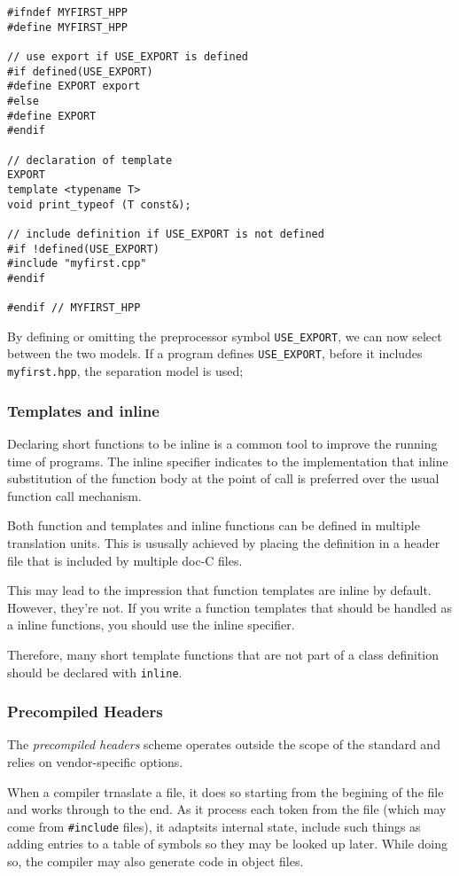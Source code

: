 \documentclass[11pt, a4paper]{book}
\begin{document}
\begin{itemize}
\begin{verbatim}
#ifndef MYFIRST_HPP 
#define MYFIRST_HPP 

// use export if USE_EXPORT is defined 
#if defined(USE_EXPORT) 
#define EXPORT export 
#else 
#define EXPORT 
#endif 

// declaration of template 
EXPORT 
template <typename T> 
void print_typeof (T const&); 

// include definition if USE_EXPORT is not defined 
#if !defined(USE_EXPORT) 
#include "myfirst.cpp" 
#endif 

#endif // MYFIRST_HPP 
\end{verbatim}
By defining or omitting the preprocessor symbol \verb|USE_EXPORT|, we can now select between the two models. If a program defines \verb|USE_EXPORT|, before it includes \verb|myfirst.hpp|, the separation model is used;
\subsubsection{Templates and inline}
Declaring short functions to be inline is a common tool to improve the running time of programs. The inline specifier indicates to the implementation that inline substitution of the function body at the point of call is preferred over the usual function call mechanism. 

Both function and templates and inline functions can be defined in multiple translation units. This is ususally achieved by placing the definition in a header file that is included by multiple doc-C files.

This may lead to the impression that function templates are inline by default. However, they're not. If you write a function templates that should be handled as a inline functions, you should use the inline specifier. 

Therefore, many short template functions that are not part of a class definition should be declared with \verb|inline|.
\subsubsection{Precompiled Headers}
The \emph{precompiled headers} scheme operates outside the scope of the standard and relies on vendor-specific options.

When a compiler trnaslate a file, it does so starting from the begining of the file and works through to the end. As it process each token from the file (which may come from \verb|#include| files), it adaptsits internal state, include such things as adding entries to a table of symbols so they may be looked up later. While doing so, the compiler may also generate code in object files.


\end{itemize}
\end{document}
